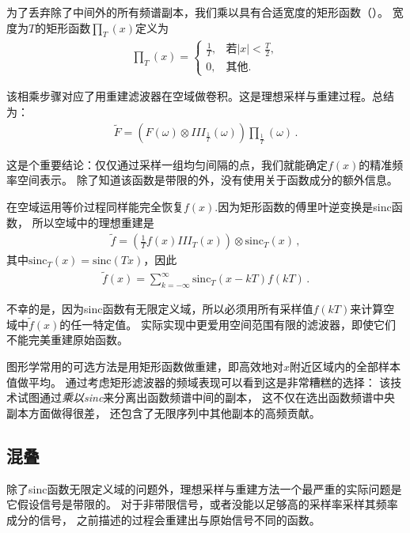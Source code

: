 为了丢弃除了中间外的所有频谱副本，我们乘以具有合适宽度的矩形函数（）。
宽度为$T$的矩形函数$\textstyle\prod_T(x)$定义为
\begin{align*}
    {\textstyle\prod_T}(x)=\left\{\begin{array}{ll}
        \displaystyle\frac{1}{T}, & \text{若}\displaystyle|x|<\frac{T}{2}, \\
        0,                        & \text{其他}.
    \end{array}\right.
\end{align*}

该相乘步骤对应了用重建滤波器在空域做卷积。这是理想采样与重建过程。总结为：
\begin{align*}
    \tilde{F}=(F(\omega)\otimes III_{\frac{1}{T}}(\omega))\textstyle\prod_{\frac{1}{T}}(\omega)\, .
\end{align*}

这是个重要结论：仅仅通过采样一组均匀间隔的点，我们就能确定$f(x)$的精准频率空间表示。
除了知道该函数是带限的外，没有使用关于函数成分的额外信息。

在空域运用等价过程同样能完全恢复$f(x)$.因为矩形函数的傅里叶逆变换是sinc函数，
所以空域中的理想重建是
\begin{align*}
    \tilde{f}=\left(\frac{1}{T}f(x)III_T(x)\right)\otimes \mathrm{sinc}_T(x)\, ,
\end{align*}
其中$\mathrm{sinc}_T(x)=\mathrm{sinc}(Tx)$，因此
\begin{align*}
    \tilde{f}(x)=\sum\limits_{k=-\infty}^{\infty}\mathrm{sinc}_T(x-kT)f(kT)\, .
\end{align*}

不幸的是，因为sinc函数有无限定义域，所以必须用所有采样值$f(kT)$来计算空域中$\tilde{f}(x)$的任一特定值。
实际实现中更爱用空间范围有限的滤波器，即使它们不能完美重建原始函数。

图形学常用的可选方法是用矩形函数做重建，即高效地对$x$附近区域内的全部样本值做平均。
通过考虑矩形滤波器的频域表现可以看到这是非常糟糕的选择：
该技术试图通过\emph{乘以sinc}来分离出函数频谱中间的副本，
这不仅在选出函数频谱中央副本方面做得很差，
还包含了无限序列中其他副本的高频贡献。

\subsection{混叠}\label{sub:混叠}
除了sinc函数无限定义域的问题外，理想采样与重建方法一个最严重的实际问题是它假设信号是带限的。
对于非带限信号，或者没能以足够高的采样率采样其频率成分的信号，
之前描述的过程会重建出与原始信号不同的函数。

